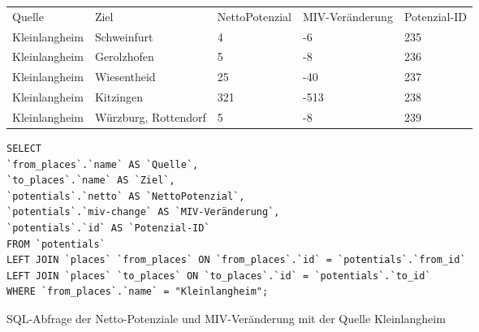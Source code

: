 \begin{tabularx}{\textwidth}{*5{X}}
Quelle & Ziel & NettoPotenzial & MIV-Veränderung & Potenzial-ID\\ 
Kleinlangheim & Schweinfurt & 4 & -6 & 235\\ 
Kleinlangheim & Gerolzhofen & 5 & -8 & 236\\ 
Kleinlangheim & Wiesentheid & 25 & -40 & 237\\ 
Kleinlangheim & Kitzingen & 321 & -513 & 238\\ 
Kleinlangheim & Würzburg, Rottendorf & 5 & -8 & 239\\ 
\end{tabularx}    
\newline
\newline
\begin{listing}[htbp]
\begin{verbatim}
SELECT
`from_places`.`name` AS `Quelle`, 
`to_places`.`name` AS `Ziel`, 
`potentials`.`netto` AS `NettoPotenzial`, 
`potentials`.`miv-change` AS `MIV-Veränderung`, 
`potentials`.`id` AS `Potenzial-ID`
FROM `potentials`
LEFT JOIN `places` `from_places` ON `from_places`.`id` = `potentials`.`from_id`
LEFT JOIN `places` `to_places` ON `to_places`.`id` = `potentials`.`to_id`
WHERE `from_places`.`name` = "Kleinlangheim";
\end{verbatim}
\caption{SQL-Abfrage der Netto-Potenziale und MIV-Veränderung mit der Quelle Kleinlangheim}\label{lst-fz-kleinlangheim}
\end{listing}